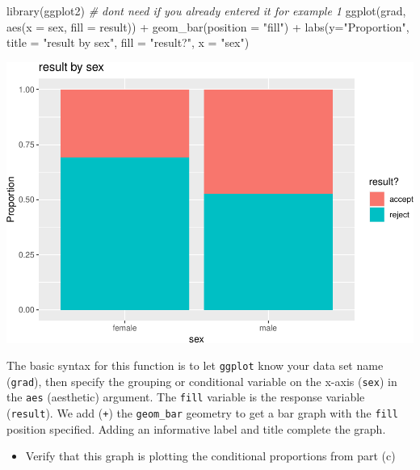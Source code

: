 \documentclass[
]{book}
\newenvironment{Shaded}{\begin{snugshade}}{\end{snugshade}}
\newcommand{\AttributeTok}[1]{\textcolor[rgb]{0.77,0.63,0.00}{#1}}
\newcommand{\CommentTok}[1]{\textcolor[rgb]{0.56,0.35,0.01}{\textit{#1}}}
\newcommand{\FunctionTok}[1]{\textcolor[rgb]{0.00,0.00,0.00}{#1}}
\newcommand{\NormalTok}[1]{#1}
\newcommand{\SpecialCharTok}[1]{\textcolor[rgb]{0.00,0.00,0.00}{#1}}
\newcommand{\StringTok}[1]{\textcolor[rgb]{0.31,0.60,0.02}{#1}}
\providecommand{\tightlist}{%
  \setlength{\itemsep}{0pt}\setlength{\parskip}{0pt}}
\begin{document}
\begin{Shaded}
\begin{Highlighting}[]
\FunctionTok{library}\NormalTok{(ggplot2) }\CommentTok{\# don\textquotesingle{}t need if you already entered it for example 1}
\FunctionTok{ggplot}\NormalTok{(grad, }\FunctionTok{aes}\NormalTok{(}\AttributeTok{x =}\NormalTok{ sex, }\AttributeTok{fill =}\NormalTok{ result)) }\SpecialCharTok{+} 
  \FunctionTok{geom\_bar}\NormalTok{(}\AttributeTok{position =} \StringTok{"fill"}\NormalTok{) }\SpecialCharTok{+} 
  \FunctionTok{labs}\NormalTok{(}\AttributeTok{y=}\StringTok{"Proportion"}\NormalTok{, }\AttributeTok{title =} \StringTok{"result by sex"}\NormalTok{, }\AttributeTok{fill =} \StringTok{"result?"}\NormalTok{, }\AttributeTok{x =} \StringTok{"sex"}\NormalTok{)}
\end{Highlighting}
\end{Shaded}

\includegraphics[width=1\linewidth]{Class_Activity_4_files/figure-latex/unnamed-chunk-25-1}

The basic syntax for this function is to let \texttt{ggplot} know your data set name (\texttt{grad}), then specify the grouping or conditional variable on the x-axis (\texttt{sex}) in the \texttt{aes} (aesthetic) argument. The \texttt{fill} variable is the response variable (\texttt{result}). We add (\texttt{+}) the \texttt{geom\_bar} geometry to get a bar graph with the \texttt{fill} position specified. Adding an informative label and title complete the graph.

\begin{itemize}
\tightlist
\item
  Verify that this graph is plotting the conditional proportions from part (c)
\end{itemize}
\end{document}
